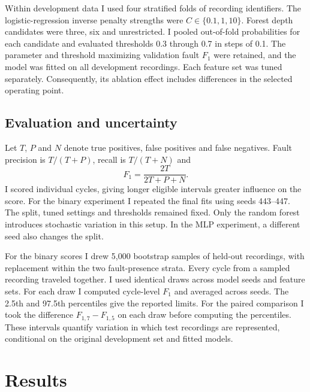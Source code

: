 \documentclass[11pt,conference,letterpaper]{IEEEtran}
\newcommand{\F}{\ensuremath{F_1}}
\begin{document}
Within development data I used four stratified folds of recording identifiers. The logistic-regression inverse penalty strengths were $C\in\{0.1,1,10\}$. Forest depth candidates were three, six and unrestricted. I pooled out-of-fold probabilities for each candidate and evaluated thresholds 0.3 through 0.7 in steps of 0.1. The parameter and threshold maximizing validation fault \F{} were retained, and the model was fitted on all development recordings. Each feature set was tuned separately. Consequently, its ablation effect includes differences in the selected operating point.

\subsection{Evaluation and uncertainty}
Let $T$, $P$ and $N$ denote true positives, false positives and false negatives. Fault precision is $T/(T+P)$, recall is $T/(T+N)$ and
\begin{equation}F_1=\frac{2T}{2T+P+N}.\end{equation}
I scored individual cycles, giving longer eligible intervals greater influence on the score. For the binary experiment I repeated the final fits using seeds 443--447. The split, tuned settings and thresholds remained fixed. Only the random forest introduces stochastic variation in this setup. In the MLP experiment, a different seed also changes the split.

For the binary scores I drew 5,000 bootstrap samples of held-out recordings, with replacement within the two fault-presence strata. Every cycle from a sampled recording traveled together. I used identical draws across model seeds and feature sets. For each draw I computed cycle-level \F{} and averaged across seeds. The 2.5th and 97.5th percentiles give the reported limits. For the paired comparison I took the difference $F_{1,7}-F_{1,5}$ on each draw before computing the percentiles. These intervals quantify variation in which test recordings are represented, conditional on the original development set and fitted models.
\section{Results}
\end{document}
